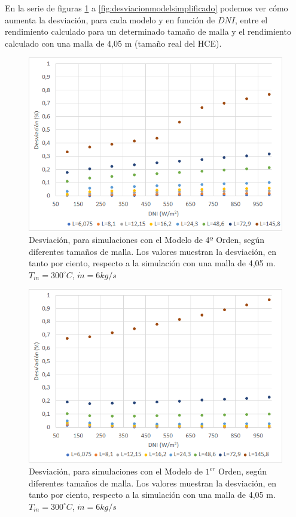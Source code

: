 En la serie de figuras \ref{fig:desviacionmodel4} a \ref{fig:desviacionmodelsimplificado} podemos ver cómo aumenta la desviación, para cada modelo y en función de $DNI$, entre el rendimiento calculado para un determinado tamaño de malla y el rendimiento calculado con una malla de 4,05 m (tamaño real del HCE).

\begin{figure}[H]
\includegraphics[width=0.9\linewidth]{images/desviacionmodel4malla.png}
\caption[Desviación, para simulaciones con el Modelo de 4º Orden, según diferentes tamaños de malla]{Desviación, para simulaciones con el Modelo de 4º Orden, según diferentes tamaños de malla. Los valores muestran la desviación, en tanto por ciento, respecto a la simulación con una malla de 4,05 m. $T_{in}=300 ^\circ C$, $\dot m = 6 kg/s$} 
\label{fig:desviacionmodel4}
\end{figure}

\begin{figure}[H]
\includegraphics[width=0.9\linewidth]{images/desviacionmodel1malla.png}
\caption[Desviación, para simulaciones con el Modelo de $1^{er}$ Orden, según diferentes tamaños de malla]{Desviación, para simulaciones con el Modelo de $1^{er}$ Orden, según diferentes tamaños de malla. Los valores muestran la desviación, en tanto por ciento, respecto a la simulación con una malla de 4,05 m. $T_{in}=300 ^\circ C$, $\dot m = 6 kg/s$} 
\label{fig:desviacionmodel1}
\end{figure}

